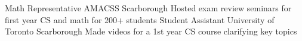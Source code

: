 \begin{cvhonors}
  \cvhonor
    {Math Representative}
    {AMACSS}
    {Scarborough}
    {}
    {Hosted exam review seminars for first year CS and math for 200+ students}
  \cvhonor
    {Student Assistant}
    {University of Toronto}
    {Scarborough}
    {}
    {Made videos for a 1st year CS course clarifying key topics}
\end{cvhonors}